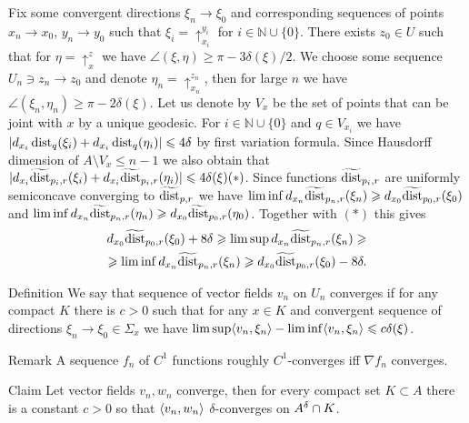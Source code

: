 Fix some convergent directions $\xi_n\to\xi_0$ and
corresponding sequences of points
$x_n\to x_0$, $y_n\to y_0$
such that  $\xi_i=\uparrow_{x_i}^{y_i}$ for $i\in\mathbb N\cup\{0\}$.
There exists $z_0 \in U$ such that for $\eta=\uparrow_x^z$ 
we have
$\angle(\xi,\eta)\ge \pi-3\delta(\xi)/2$.
We choose some sequence 
$U_n\ni z_n\to z_0$
and denote
$\eta_n=\uparrow_{x_n}^{z_n}$,
then for large $n$ we have $\angle(\xi_n,\eta_n)\ge \pi-2\delta(\xi)$.
Let us denote by $V_x$ be the set of points that can be joint with $x$
by a unique geodesic. For $i\in\mathbb N\cup\{0\}$ and
$q\in V_{x_i}$ we have $|d_{x_i} \operatorname{dist}_q(\xi_i)+d_{x_i} \operatorname{dist}_q(\eta_i)|\leqslant 4\delta$ by first
variation formula.
Since Hausdorff dimension of $A\setminus V_x\le n-1$ we also obtain
that
$|d_{x_i} \widetilde{\operatorname{dist}}_{p_i,r}(\xi_i)+d_{x_i} \widetilde{\operatorname{dist}}_{p_i,r}(\eta_i)|\leqslant 4\delta(\xi) (*)$.
Since functions
$\widetilde{\operatorname{dist}}_{p_i,r}$ are uniformly semiconcave converging to
$\widetilde{\operatorname{dist}}_{p,r}$ we have
$\liminf d_{x_n}\widetilde{\operatorname{dist}}_{p_n,r}(\xi_n)\geqslant d_{x_0}\widetilde{\operatorname{dist}}_{p_0,r}(\xi_0)$ and $\liminf d_{x_n}\widetilde{\operatorname{dist}}_{p_n,r}(\eta_n)\geqslant d_{x_0}\widetilde{\operatorname{dist}}_{p_0,r}(\eta_0)$.
Together with $(*)$ this gives
\begin{align*}
 d_{x_0}\widetilde{\operatorname{dist}}_{p_0,r}(\xi_0)+8\delta\geqslant
\limsup d_{x_n}\widetilde{\operatorname{dist}}_{p_n,r}(\xi_n)\geqslant\\
\geqslant
\liminf d_{x_n}\widetilde{\operatorname{dist}}_{p_n,r}(\xi_n)\geqslant d_{x_0}\widetilde{\operatorname{dist}}_{p_0,r}(\xi_0)-8\delta.
\end{align*}

\begin{thm}{Definition}
We say that sequence of vector fields $v_n$ on $U_n$
converges if for any compact $K$ there is $c>0$ such that
for any $x\in K$ and convergent sequence of directions $\xi_n\to\xi_0\in \Sigma_x$ we have
$\limsup \langle v_n,\xi_n\rangle-\liminf \langle v_n,\xi_n\rangle\leqslant c\delta(\xi)$.



\end{thm}

\begin{thm}{Remark}
A sequence $f_n$ of $C^1$ functions roughly $C^1$-converges
iff $\nabla f_n$ converges.

\end{thm}


\begin{thm}{Claim}\label{lem:scalprod}
Let vector fields $v_n, w_n$ converge, then for every compact
set $K\subset A$ there is a constant $c>0$ so that
$\langle v_n, w_n\rangle$ $\delta$-converges on $A^\delta\cap K$.
\end{thm}

